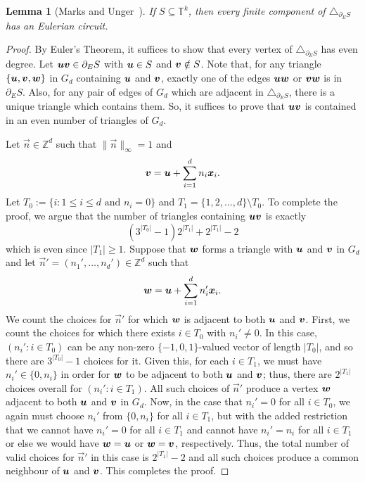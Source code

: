 \documentclass[12pt,a4paper]{amsart}
\numberwithin{equation}{section}
\newtheorem{lemma}[equation]{Lemma}
\theoremstyle{definition}
\begin{document}
\begin{lemma}[Marks and Unger~{\cite[Proof of Lemma~5.6]{MarksUnger17}}]
\label{lem:triEvenDeg}
If $S\subseteq \mathbb{T}^k$, then every finite component of $\triangle_{\partial_ES}$ has an Eulerian circuit. 
\end{lemma}

\begin{proof}
By Euler's Theorem, it suffices to show that every vertex of $\triangle_{\partial_ES}$ has even degree. Let $\boldsymbol{u}\boldsymbol{v}\in \partial_E S$ with $\boldsymbol{u}\in S$ and $\boldsymbol{v}\notin S$. Note that, for any triangle $\{\boldsymbol{u},\boldsymbol{v},\boldsymbol{w}\}$ in $G_d$ containing $\boldsymbol{u}$ and $\boldsymbol{v}$, exactly one of the edges $\boldsymbol{u}\boldsymbol{w}$ or $\boldsymbol{v}\boldsymbol{w}$ is in $\partial_ES$. Also, for any pair of edges of $G_d$ which are adjacent in $\triangle_{\partial_ES}$, there is a unique triangle which contains them.  So, it suffices to prove that $\boldsymbol{u}\boldsymbol{v}$ is contained in an even number of triangles of $G_d$.

Let $\vec{n}\in \mathbb{Z}^d$ such that $\|\vec{n}\|_\infty =1$ and
\[\boldsymbol{v}=\boldsymbol{u}+\sum_{i=1}^dn_i\boldsymbol{x}_i.\]
Let $T_0:=\{i: 1\leq i\leq d\text{ and }n_i=0\}$ and $T_1=\{1,2,\dots,d\}\setminus T_0$. To complete the proof, we argue that the number of triangles containing $\boldsymbol{u}\boldsymbol{v}$ is exactly 
\[\left(3^{|T_0|}-1\right)2^{|T_1|} + 2^{|T_1|}-2\]
which is even since $|T_1|\geq1$. Suppose that $\boldsymbol{w}$ forms a triangle with $\boldsymbol{u}$ and $\boldsymbol{v}$ in $G_d$ and let $\vec{n}'=(n_1',\dots,n_d')\in\mathbb{Z}^d$ such that
\[\boldsymbol{w}=\boldsymbol{u}+\sum_{i=1}^dn_i'\boldsymbol{x}_i.\]
We count the choices for $\vec{n}'$ for which $\boldsymbol{w}$ is adjacent to both $\boldsymbol{u}$ and $\boldsymbol{v}$. First, we count the choices for which there exists $i\in T_0$ with $n_i'\neq 0$. In this case, $(n_i': i\in T_0)$ can be any non-zero $\{-1,0,1\}$-valued vector of length $|T_0|$, and so there are $3^{|T_0|}-1$ choices for it. Given this, for each $i\in T_1$, we must have $n_i'\in \{0,n_i\}$ in order for $\boldsymbol{w}$ to be adjacent to both $\boldsymbol{u}$ and $\boldsymbol{v}$; thus, there are $2^{|T_1|}$ choices overall for $(n_i': i\in T_1)$. All such choices of $\vec{n}'$ produce a vertex $\boldsymbol{w}$ adjacent to both $\boldsymbol{u}$ and $\boldsymbol{v}$ in $G_d$. Now, in the case that $n_i'=0$ for all $i\in T_0$, we again must choose $n_i'$ from $\{0,n_i\}$ for all $i\in T_1$, but with the added restriction that we cannot have $n_i'=0$ for all $i\in T_1$ and cannot have $n_i'=n_i$ for all $i\in T_1$ or else we would have $\boldsymbol{w}=\boldsymbol{u}$ or $\boldsymbol{w}=\boldsymbol{v}$, respectively. Thus, the total number of valid choices for $\vec{n}'$ in this case is $2^{|T_1|}-2$ and all such choices produce a common neighbour of $\boldsymbol{u}$ and $\boldsymbol{v}$. This completes the proof.
\end{proof}
\end{document}
